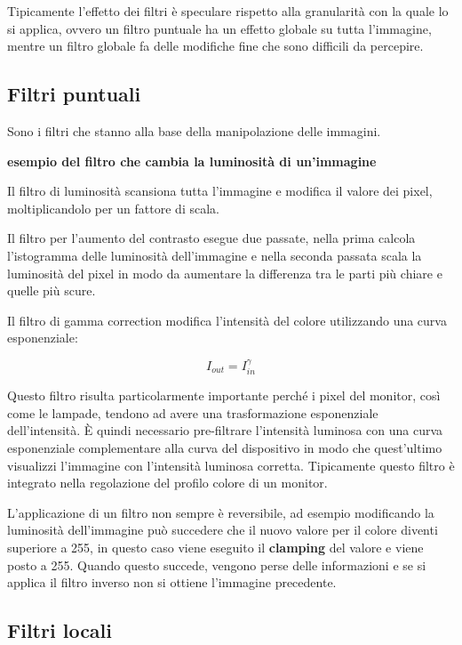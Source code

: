 Tipicamente l'effetto dei filtri è speculare rispetto alla granularità
con la quale lo si applica, ovvero un filtro puntuale ha un effetto
globale su tutta l'immagine, mentre un filtro globale fa delle modifiche
fine che sono difficili da percepire.

\subsection{Filtri puntuali}\label{filtri-puntuali}

Sono i filtri che stanno alla base della manipolazione delle immagini.

\textbf{esempio del filtro che cambia la luminosità di un'immagine}

Il filtro di luminosità scansiona tutta l'immagine e modifica il valore
dei pixel, moltiplicandolo per un fattore di scala.

Il filtro per l'aumento del contrasto esegue due passate, nella prima
calcola l'istogramma delle luminosità dell'immagine e nella seconda
passata scala la luminosità del pixel in modo da aumentare la differenza
tra le parti più chiare e quelle più scure.

Il filtro di gamma correction modifica l'intensità del colore
utilizzando una curva esponenziale:

$$
I_{out} = I_{in}^{\gamma}
$$

Questo filtro risulta particolarmente importante perché i pixel del
monitor, così come le lampade, tendono ad avere una trasformazione
esponenziale dell'intensità. È quindi necessario pre-filtrare l'intensità
luminosa con una curva esponenziale complementare alla curva del
dispositivo in modo che quest'ultimo visualizzi l'immagine con
l'intensità luminosa corretta. Tipicamente questo filtro è integrato
nella regolazione del profilo colore di un monitor.

L'applicazione di un filtro non sempre è reversibile, ad esempio
modificando la luminosità dell'immagine può succedere che il nuovo
valore per il colore diventi superiore a 255, in questo caso viene
eseguito il \textbf{clamping} del valore e viene posto a 255. Quando
questo succede, vengono perse delle informazioni e se si applica il
filtro inverso non si ottiene l'immagine precedente.

\subsection{Filtri locali}\label{filtri-locali}

